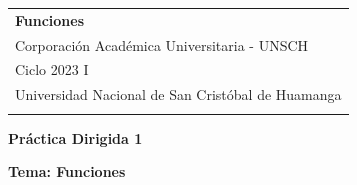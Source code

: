 \documentclass[a4paper,10pt]{article} %
\begin{document}



\thispagestyle{empty} %

\begin{tabular}{p{15.5cm}} %
{\large \bf Funciones} \\
Corporación Académica Universitaria - UNSCH \\ Ciclo 2023 I  \\ Universidad Nacional de San Cristóbal de Huamanga\\
\hline %
\\
\end{tabular} %

\vspace*{0.3cm} %

\begin{center} %
	{\Large \bf Práctica Dirigida 1} %
	\vspace{2mm}
	
	{\bf Tema: Funciones} %
		
\end{center}  

\vspace{0.4cm}

\end{document}
